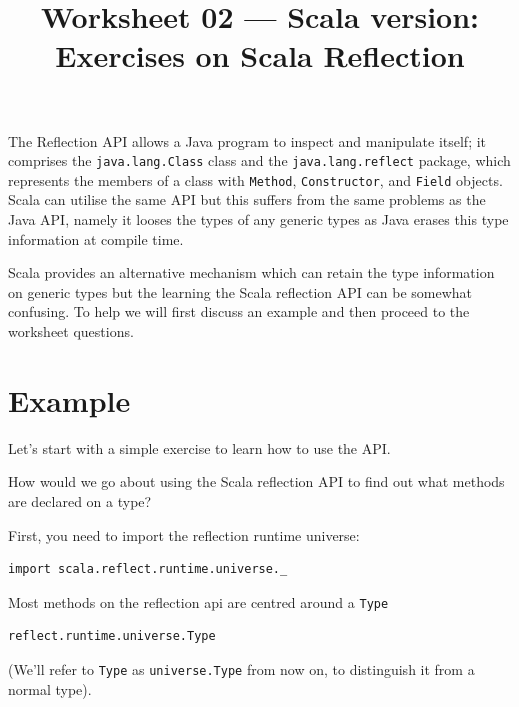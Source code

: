 \documentclass[11pt,a4paper,answers]{exam}
\title{Worksheet 02 --- Scala version: Exercises on Scala Reflection}
\author{}
\date{}
\begin{document}
\maketitle

The Reflection API allows a Java program to inspect and manipulate itself; it comprises the \verb!java.lang.Class! 
class and the \verb!java.lang.reflect! package, which represents the members of a class with \verb!Method!, 
\verb!Constructor!, and \verb!Field! objects. Scala can utilise the same API but this suffers from the same problems 
as the Java API, namely it looses the types of any generic types as 
Java erases this type information at compile time. 

Scala provides an alternative mechanism which can retain the type information on generic types but the learning the 
Scala reflection API can be somewhat confusing. To help we will first discuss an example and then proceed to the 
worksheet questions.

\section*{Example}

Let's start with a simple exercise to learn how to use the API.

How would we go about using the Scala reflection API to find out what methods are declared on a type?

First, you need to import the reflection runtime universe:
\begin{Verbatim}
import scala.reflect.runtime.universe._	
\end{Verbatim}
Most methods on the reflection api are centred around a \verb!Type! 
\begin{Verbatim}
reflect.runtime.universe.Type	
\end{Verbatim}
(We'll refer to \verb!Type! as 
\verb!universe.Type! from now on, to distinguish it from a normal type).
\end{document}
